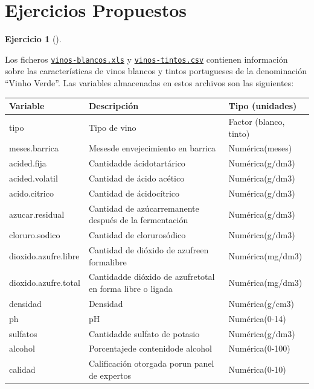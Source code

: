 \documentclass[
  a4paper,
]{scrreport}
\theoremstyle{definition}
\newtheorem{exercise}{Ejercicio}[chapter]
\theoremstyle{remark}
\begin{document}
\section{Ejercicios Propuestos}\label{ejercicios-propuestos-1}

\begin{exercise}[]\protect\hypertarget{exr-preprocesamiento-5}{}\label{exr-preprocesamiento-5}

Los ficheros \href{datos/vinos-blancos.xls}{\texttt{vinos-blancos.xls}}
y \href{datos/vinos-tintos.csv}{\texttt{vinos-tintos.csv}} contienen
información sobre las características de vinos blancos y tintos
portugueses de la denominación ``Vinho Verde''. Las variables
almacenadas en estos archivos son las siguientes:

\begin{longtable}[]{@{}
  >{\raggedright\arraybackslash}p{}
  >{\raggedright\arraybackslash}p{}
  >{\raggedright\arraybackslash}p{}@{}}
\toprule\noalign{}
\begin{minipage}[b]{\linewidth}\raggedright
Variable
\end{minipage} & \begin{minipage}[b]{\linewidth}\raggedright
Descripción
\end{minipage} & \begin{minipage}[b]{\linewidth}\raggedright
Tipo (unidades)
\end{minipage} \\
\midrule\noalign{}
\endhead
\bottomrule\noalign{}
\endlastfoot
tipo & Tipo de vino & Factor (blanco, tinto) \\
meses.barrica & Mesesde envejecimiento en barrica & Numérica(meses) \\
acided.fija & Cantidadde ácidotartárico & Numérica(g/dm3) \\
acided.volatil & Cantidad de ácido acético & Numérica(g/dm3) \\
acido.citrico & Cantidad de ácidocítrico & Numérica(g/dm3) \\
azucar.residual & Cantidad de azúcarremanente después de la fermentación
& Numérica(g/dm3) \\
cloruro.sodico & Cantidad de clorurosódico & Numérica(g/dm3) \\
dioxido.azufre.libre & Cantidad de dióxido de azufreen formalibre &
Numérica(mg/dm3) \\
dioxido.azufre.total & Cantidadde dióxido de azufretotal en forma libre
o ligada & Numérica(mg/dm3) \\
densidad & Densidad & Numérica(g/cm3) \\
ph & pH & Numérica(0-14) \\
sulfatos & Cantidadde sulfato de potasio & Numérica(g/dm3) \\
alcohol & Porcentajede contenidode alcohol & Numérica(0-100) \\
calidad & Calificación otorgada porun panel de expertos &
Numérica(0-10) \\
\end{longtable}


\end{exercise}
\end{document}
